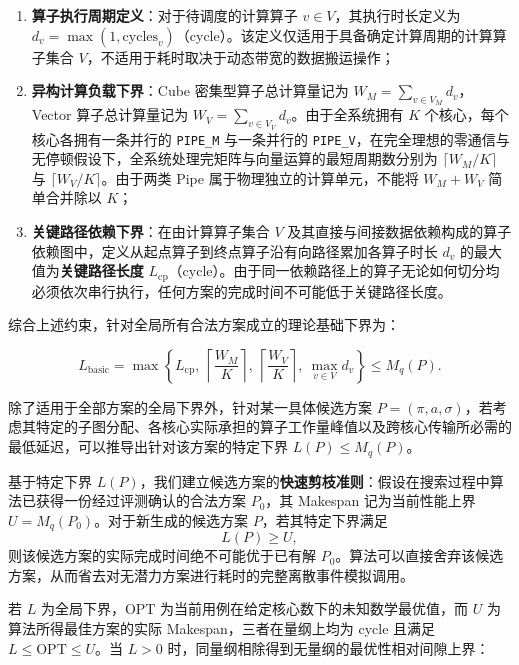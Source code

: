 \documentclass[anonymous,notoc]{gmcm2026}
\providecommand{\tightlist}{\setlength{\itemsep}{0pt}\setlength{\parskip}{0pt}}
\begin{document}
\begin{enumerate}
\def\labelenumi{\arabic{enumi}.}
\tightlist
\item
  \textbf{算子执行周期定义}：对于待调度的计算算子 \(v \in V\)，其执行时长定义为 \(d_v = \max(1, \text{cycles}_v)\)（cycle）。该定义仅适用于具备确定计算周期的计算算子集合 \(V\)，不适用于耗时取决于动态带宽的数据搬运操作；
\item
  \textbf{异构计算负载下界}：Cube 密集型算子总计算量记为 \(W_M = \sum_{v \in V_M} d_v\)，Vector 算子总计算量记为 \(W_V = \sum_{v \in V_V} d_v\)。由于全系统拥有 \(K\) 个核心，每个核心各拥有一条并行的 \texttt{PIPE\_M} 与一条并行的 \texttt{PIPE\_V}，在完全理想的零通信与无停顿假设下，全系统处理完矩阵与向量运算的最短周期数分别为 \(\lceil W_M / K \rceil\) 与 \(\lceil W_V / K \rceil\)。由于两类 Pipe 属于物理独立的计算单元，不能将 \(W_M + W_V\) 简单合并除以 \(K\)；
\item
  \textbf{关键路径依赖下界}：在由计算算子集合 \(V\) 及其直接与间接数据依赖构成的算子依赖图中，定义从起点算子到终点算子沿有向路径累加各算子时长 \(d_v\) 的最大值为\textbf{关键路径长度} \(L_{\mathrm{cp}}\)（cycle）。由于同一依赖路径上的算子无论如何切分均必须依次串行执行，任何方案的完成时间不可能低于关键路径长度。
\end{enumerate}

综合上述约束，针对全局所有合法方案成立的理论基础下界为：

\begin{equation}
L_{\mathrm{basic}} = \max\left\{L_{\mathrm{cp}},\ \left\lceil\frac{W_M}{K}\right\rceil,\ \left\lceil\frac{W_V}{K}\right\rceil,\ \max_{v\in V}d_v\right\} \le M_q(P).
\end{equation}

除了适用于全部方案的全局下界外，针对某一具体候选方案 \(P = (\pi, a, \sigma)\)，若考虑其特定的子图分配、各核心实际承担的算子工作量峰值以及跨核心传输所必需的最低延迟，可以推导出针对该方案的特定下界 \(L(P) \le M_q(P)\)。

基于特定下界 \(L(P)\)，我们建立候选方案的\textbf{快速剪枝准则}：假设在搜索过程中算法已获得一份经过评测确认的合法方案 \(P_0\)，其 Makespan 记为当前性能上界 \(U = M_q(P_0)\)。对于新生成的候选方案 \(P\)，若其特定下界满足 \begin{equation}
L(P) \ge U,
\end{equation} 则该候选方案的实际完成时间绝不可能优于已有解 \(P_0\)。算法可以直接舍弃该候选方案，从而省去对无潜力方案进行耗时的完整离散事件模拟调用。

若 \(L\) 为全局下界，\(\mathrm{OPT}\) 为当前用例在给定核心数下的未知数学最优值，而 \(U\) 为算法所得最佳方案的实际 Makespan，三者在量纲上均为 cycle 且满足 \(L \le \mathrm{OPT} \le U\)。当 \(L > 0\) 时，同量纲相除得到无量纲的最优性相对间隙上界：
\end{document}
